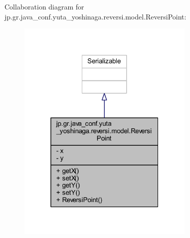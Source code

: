 Collaboration diagram for jp.\+gr.\+java\+\_\+conf.\+yuta\+\_\+yoshinaga.\+reversi.\+model.\+Reversi\+Point\+:
\nopagebreak
\begin{figure}[H]
\begin{center}
\leavevmode
\includegraphics[width=241pt]{classjp_1_1gr_1_1java__conf_1_1yuta__yoshinaga_1_1reversi_1_1model_1_1_reversi_point__coll__graph}
\end{center}
\end{figure}
